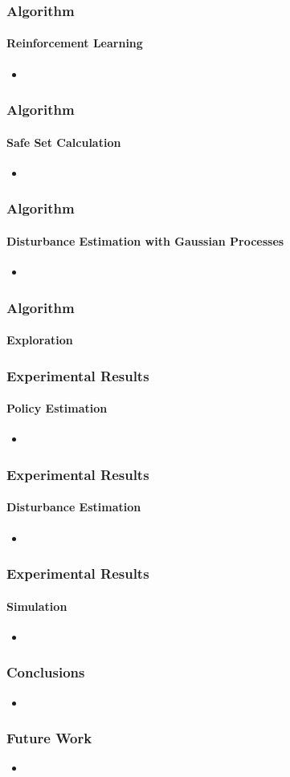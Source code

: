 \documentclass[t]{beamer}
\begin{document}
\begin{frame}
\frametitle{Algorithm}
\framesubtitle{Reinforcement Learning}
\begin{itemize}
\item 
\end{itemize}
\end{frame}


\begin{frame}
\frametitle{Algorithm}
\framesubtitle{Safe Set Calculation}
\begin{itemize}
\item 
\end{itemize}
\end{frame}


\begin{frame}
\frametitle{Algorithm}
\framesubtitle{Disturbance Estimation with Gaussian Processes}
\begin{itemize}
\item 
\end{itemize}
\end{frame}

\begin{frame}
\frametitle{Algorithm}
\framesubtitle{Exploration}
\end{frame}

\begin{frame}
\frametitle{Experimental Results}
\framesubtitle{Policy Estimation}
\begin{itemize}
\item 
\end{itemize}
\end{frame}

\begin{frame}
\frametitle{Experimental Results}
\framesubtitle{Disturbance Estimation}
\begin{itemize}
\item 
\end{itemize}
\end{frame}

\begin{frame}
\frametitle{Experimental Results}
\framesubtitle{Simulation}
\begin{itemize}
\item 
\end{itemize}
\end{frame}


\begin{frame}
\frametitle{Conclusions}
\begin{itemize}
\item 
\end{itemize}
\end{frame}

\begin{frame}
\frametitle{Future Work}
\begin{itemize}
\item 
\end{itemize}
\end{frame}
\end{document}
